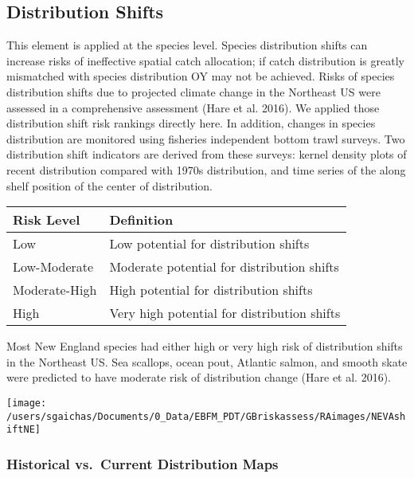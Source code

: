 \documentclass[11pt,]{article}
\let\origfigure\figure
\let\endorigfigure\endfigure
\renewenvironment{figure}[1][2] {
    \expandafter\origfigure\expandafter[H]
} {
    \endorigfigure
}
\begin{document}
\subsection{Distribution Shifts}\label{distribution-shifts}

This element is applied at the species level. Species distribution
shifts can increase risks of ineffective spatial catch allocation; if
catch distribution is greatly mismatched with species distribution OY
may not be achieved. Risks of species distribution shifts due to
projected climate change in the Northeast US were assessed in a
comprehensive assessment (Hare et al. 2016). We applied those
distribution shift risk rankings directly here. In addition, changes in
species distribution are monitored using fisheries independent bottom
trawl surveys. Two distribution shift indicators are derived from these
surveys: kernel density plots of recent distribution compared with 1970s
distribution, and time series of the along shelf position of the center
of distribution.

\begin{longtable}[]{@{}ll@{}}
\toprule
Risk Level & Definition\tabularnewline
\midrule
\endhead
Low & Low potential for distribution shifts\tabularnewline
Low-Moderate & Moderate potential for distribution shifts\tabularnewline
Moderate-High & High potential for distribution shifts\tabularnewline
High & Very high potential for distribution shifts\tabularnewline
\bottomrule
\end{longtable}

Most New England species had either high or very high risk of
distribution shifts in the Northeast US. Sea scallops, ocean pout,
Atlantic salmon, and smooth skate were predicted to have moderate risk
of distribution change (Hare et al. 2016).

\begin{figure}

{\centering \texttt{[image: /users/sgaichas/Documents/0\_Data/EBFM\_PDT/GBriskassess/RAimages/NEVAshiftNE]} 

}

\caption{Results of Northeast Climate Vulnerability Analysis (Hare et al. 2016) for Mid-Atlantic species distribution shift risk \label{NEVAshift}}\label{fig:unnamed-chunk-10}
\end{figure}

\subsubsection{Historical vs.~Current Distribution
Maps}\label{historical-vs.current-distribution-maps}
\end{document}
